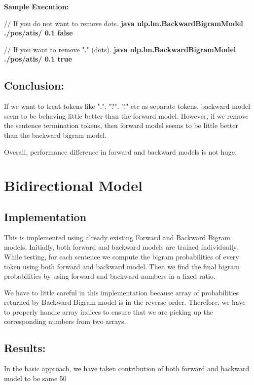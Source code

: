 {\bfseries Sample Execution:}

// If you do not want to remove dots.
\newline
{\bfseries java nlp.lm.BackwardBigramModel ./pos/atis/ 0.1 false}


// If you want to remove "." (dots).
\newline
{\bfseries java nlp.lm.BackwardBigramModel ./pos/atis/ 0.1 true}

\subsection{Conclusion: }

If we want to treat tokens like ".", "?", "!" etc as separate tokens, backward model seem to be behaving little better than the forward model. However, if we remove the sentence termination tokens, then forward model seems to be little better than the backward bigram model.

Overall, performance difference in forward and backward models is not huge.

\section {Bidirectional Model}

\subsection {Implementation}

This is implemented using already existing Forward and Backward Bigram models. Initially, both forward and backward models are trained individually. While testing, for each sentence we compute the bigram probabilities of every token using both forward and backward model. Then we find the final bigram probabilities by using forward and backward numbers in a fixed ratio.

We have to little careful in this implementation because array of probabilities returned by Backward Bigram model is in the reverse order. Therefore, we have to properly handle array indices to ensure that we are picking up the corresponding numbers from two arrays.

\subsection{Results:}

In the basic approach, we have taken contribution of both forward and backward model to be same 50%

